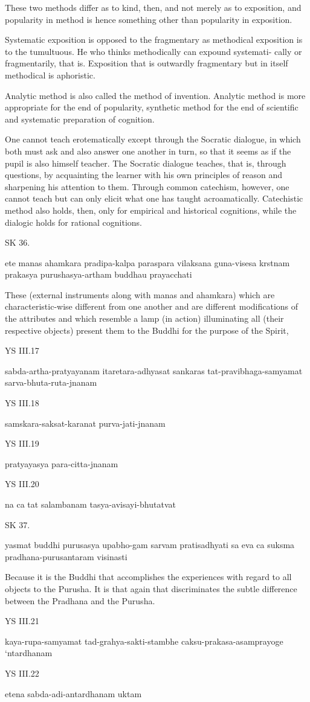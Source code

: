     These two methods differ as to kind, then, and not merely as to exposition,
    and popularity in method is hence something other than popularity in exposition.

    Systematic exposition is opposed to the fragmentary as methodical exposition
    is to the tumultuous. He who thinks methodically can expound systemati-
    cally or fragmentarily, that is. Exposition that is outwardly fragmentary but
    in itself methodical is aphoristic.

    Analytic method is also called the method of invention.
    Analytic method is more appropriate for the end of popularity,
    synthetic method for the end of scientific and systematic preparation of cognition.

    One cannot teach erotematically except through the Socratic dialogue, in
    which both must ask and also answer one another in turn, so that it seems
    as if the pupil is also himself teacher. The Socratic dialogue teaches, that
    is, through questions, by acquainting the learner with his own principles of
    reason and sharpening his attention to them. Through common catechism,
    however, one cannot teach but can only elicit what one has taught
    acroamatically. Catechistic method also holds, then, only for empirical and
    historical cognitions, while the dialogic holds for rational cognitions.

SK 36.

ete manas ahamkara pradipa-kalpa paraspara vilaksana
guna-visesa krstnam prakasya purushasya-artham buddhau prayacchati

These (external instruments along with manas and ahamkara)
which are characteristic-wise different from one another
and are different modifications of the attributes
and which resemble a lamp (in action) illuminating all (their respective objects)
present them to the Buddhi for the purpose of the Spirit,

YS III.17

    sabda-artha-pratyayanam itaretara-adhyasat sankaras tat-pravibhaga-samyamat sarva-bhuta-ruta-jnanam

YS III.18

    samskara-saksat-karanat purva-jati-jnanam

YS III.19

    pratyayasya para-citta-jnanam

YS III.20

    na ca tat salambanam tasya-avisayi-bhutatvat

SK 37.

yasmat buddhi purusasya upabho-gam sarvam pratisadhyati
sa eva ca suksma pradhana-purusantaram visinasti

Because it is the Buddhi that accomplishes the experiences
with regard to all objects to the Purusha.
It is that again that discriminates the subtle difference
between the Pradhana and the Purusha.

YS III.21

    kaya-rupa-samyamat tad-grahya-sakti-stambhe caksu-prakasa-asamprayoge ‘ntardhanam

YS III.22

    etena sabda-adi-antardhanam uktam
